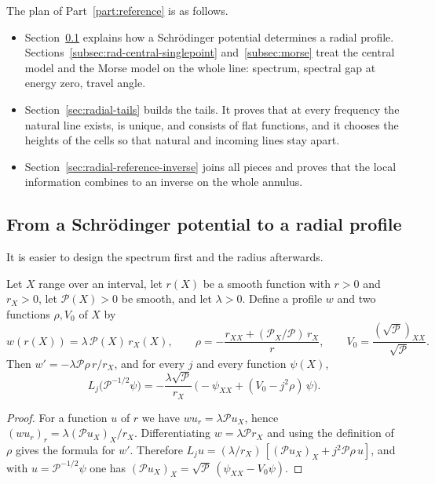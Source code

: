 The plan of Part~\ref{part:reference} is as follows.
\begin{itemize}
\item Section~\ref{subsec:liouville} explains how a Schr\"odinger
 potential determines a radial profile.
 Sections~\ref{subsec:rad-central-singlepoint}
 and~\ref{subsec:morse} treat the central model and the Morse model on
 the whole line: spectrum, spectral gap at energy zero, travel angle.
\item Section~\ref{sec:radial-tails} builds the tails. It proves that
 at every frequency the natural line exists, is unique, and consists
 of flat functions, and it chooses the heights of the cells so that
 natural and incoming lines stay apart.
\item Section~\ref{sec:radial-reference-inverse} joins all pieces and
 proves that the local information combines to an inverse on the whole
 annulus.
\end{itemize}

\subsection{From a Schr\"odinger potential to a radial profile}
\label{subsec:liouville}

It is easier to design the spectrum first and the radius afterwards.

\begin{lemma}\label{lem:liouville}
Let $X$ range over an interval, let $r(X)$ be a smooth function with
$r>0$ and $r_X>0$, let $\mathcal P(X)>0$ be smooth, and let
$\lambda>0$. Define a profile $w$ and two functions $\rho,V_0$ of $X$
by
\begin{equation}\label{eq:rad-eq-sc0}
 w(r(X))=\lambda\,\mathcal P(X)\,r_X(X),\qquad
 \rho=-\frac{r_{XX}+(\mathcal P_X/\mathcal P)\,r_X}{r},\qquad
 V_0=\frac{(\sqrt{\mathcal P})_{XX}}{\sqrt{\mathcal P}} .
\end{equation}
Then $w'=-\lambda\mathcal P\rho\,r/r_X$, and for every $j$ and every
function $\psi(X)$,
\begin{equation}\label{eq:liouville-identity}
 L_j\bigl(\mathcal P^{-1/2}\psi\bigr)
   =-\frac{\lambda\sqrt{\mathcal P}}{r_X}\,
      \bigl(-\psi_{XX}+(V_0-j^2\rho)\,\psi\bigr).
\end{equation}
\end{lemma}

\begin{proof}
For a function $u$ of $r$ we have $wu_r=\lambda\mathcal Pu_X$, hence
$(wu_r)_r=\lambda(\mathcal Pu_X)_X/r_X$. Differentiating
$w=\lambda\mathcal Pr_X$ and using the definition of $\rho$ gives the
formula for $w'$. Therefore
$L_ju=(\lambda/r_X)\,[(\mathcal Pu_X)_X+j^2\mathcal P\rho\,u]$, and
with $u=\mathcal P^{-1/2}\psi$ one has
$(\mathcal Pu_X)_X=\sqrt{\mathcal P}\,(\psi_{XX}-V_0\psi)$.
\end{proof}


